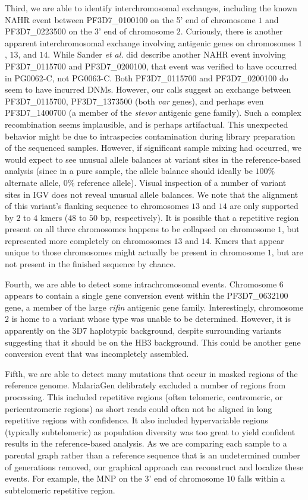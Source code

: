 Third, we are able to identify interchromosomal exchanges, including the known NAHR event between PF3D7\_0100100 on the 5' end of chromosome $1$ and PF3D7\_0223500 on the 3' end of chromosome $2$\cite{Anonymous:2013hi}.  Curiously, there is another apparent interchromosomal exchange involving antigenic genes on chromosomes $1$, $13$, and $14$.  While Sander \textit{et al.} did describe another NAHR event involving PF3D7\_0115700 and PF3D7\_0200100, that event was verified to have occurred in PG0062-C, not PG0063-C.  Both PF3D7\_0115700 and PF3D7\_0200100 do seem to have incurred DNMs.  However, our calls suggest an exchange between PF3D7\_0115700, PF3D7\_1373500 (both \textit{var} genes), and perhaps even PF3D7\_1400700 (a member of the \textit{stevor} antigenic gene family).  Such a complex recombination seems implausible, and is perhaps artifactual.  This unexpected behavior might be due to intraspecies contamination during library preparation of the sequenced samples.  However, if significant sample mixing had occurred, we would expect to see unusual allele balances at variant sites in the reference-based analysis (since in a pure sample, the allele balance should ideally be $100\%$ alternate allele, $0\%$ reference allele).  Visual inspection of a number of variant sites in IGV does not reveal unusual allele balances.  We note that the alignment of this variant's flanking sequence to chromosomes $13$ and $14$ are only supported by $2$ to $4$ kmers ($48$ to $50$ bp, respectively).  It is possible that a repetitive region present on all three chromosomes happens to be collapsed on chromosome $1$, but represented more completely on chromosomes $13$ and $14$.  Kmers that appear unique to those chromosomes might actually be present in chromosome $1$, but are not present in the finished sequence by chance.

Fourth, we are able to detect some intrachromosomal events.  Chromosome $6$ appears to contain a single gene conversion event within the PF3D7\_0632100 gene, a member of the large \textit{rifin} antigenic gene family.  Interestingly, chromosome $2$ is home to a variant whose type was unable to be determined.  However, it is apparently on the 3D7 haplotypic background, despite surrounding variants suggesting that it should be on the HB3 background.  This could be another gene conversion event that was incompletely assembled.

Fifth, we are able to detect many mutations that occur in masked regions of the reference genome.  MalariaGen delibrately excluded a number of regions from processing.  This included repetitive regions (often telomeric, centromeric, or pericentromeric regions) as short reads could often not be aligned in long repetitive regions with confidence.  It also included hypervariable regions (typically subtelomeric) as population diversity was too great to yield confident results in the reference-based analysis.  As we are comparing each sample to a parental graph rather than a reference sequence that is an undetermined number of generations removed, our graphical approach can reconstruct and localize these events.  For example, the MNP on the 3' end of chromosome $10$ falls within a subtelomeric repetitive region.

